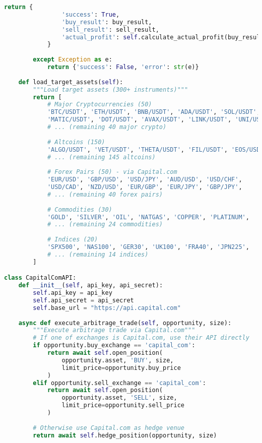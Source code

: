 \documentclass[12pt,a4paper]{article}
\begin{document}
\begin{lstlisting}[language=Python, caption=Multi-Exchange Arbitrage System]
            return {
                'success': True,
                'buy_result': buy_result,
                'sell_result': sell_result,
                'actual_profit': self.calculate_actual_profit(buy_result, sell_result)
            }
            
        except Exception as e:
            return {'success': False, 'error': str(e)}
    
    def load_target_assets(self):
        """Load target assets (300+ instruments)"""
        return [
            # Major Cryptocurrencies (50)
            'BTC/USDT', 'ETH/USDT', 'BNB/USDT', 'ADA/USDT', 'SOL/USDT',
            'MATIC/USDT', 'DOT/USDT', 'AVAX/USDT', 'LINK/USDT', 'UNI/USDT',
            # ... (remaining 40 major crypto)
            
            # Altcoins (150)
            'ALGO/USDT', 'VET/USDT', 'THETA/USDT', 'FIL/USDT', 'EOS/USDT',
            # ... (remaining 145 altcoins)
            
            # Forex Pairs (50) - via Capital.com
            'EUR/USD', 'GBP/USD', 'USD/JPY', 'AUD/USD', 'USD/CHF',
            'USD/CAD', 'NZD/USD', 'EUR/GBP', 'EUR/JPY', 'GBP/JPY',
            # ... (remaining 40 forex pairs)
            
            # Commodities (30)
            'GOLD', 'SILVER', 'OIL', 'NATGAS', 'COPPER', 'PLATINUM',
            # ... (remaining 24 commodities)
            
            # Indices (20)
            'SPX500', 'NAS100', 'GER30', 'UK100', 'FRA40', 'JPN225',
            # ... (remaining 14 indices)
        ]

class CapitalComAPI:
    def __init__(self, api_key, api_secret):
        self.api_key = api_key
        self.api_secret = api_secret
        self.base_url = "https://api.capital.com"
    
    async def execute_arbitrage_trade(self, opportunity, size):
        """Execute arbitrage trade via Capital.com"""
        # If one of exchanges is Capital.com, use their API directly
        if opportunity.buy_exchange == 'capital_com':
            return await self.open_position(
                opportunity.asset, 'BUY', size, 
                limit_price=opportunity.buy_price
            )
        elif opportunity.sell_exchange == 'capital_com':
            return await self.open_position(
                opportunity.asset, 'SELL', size,
                limit_price=opportunity.sell_price
            )
        
        # Otherwise use Capital.com as hedge venue
        return await self.hedge_position(opportunity, size)
\end{lstlisting}
\end{document}
